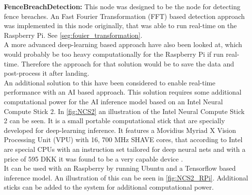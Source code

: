 \documentclass[../Head/Main.tex]{subfiles}
\begin{document}
\textbf{FenceBreachDetection:}
This node was designed to be the node for detecting fence breaches. An Fast Fourier Transformation (FFT) based detection approach was implemented in this node originally, that was able to run real-time on the Raspberry Pi. See \autoref{seg:fouier_transformation}.\\ 
A more advanced deep-learning based approach have also been looked at, which would probably be too heavy computationally for the Raspberry Pi if run real-time. Therefore the approach for that solution would be to save the data and post-process it after landing.\\
An additional solution to this have been considered to enable real-time performance with an AI based approach. This solution requires some additional computational power for the AI inference model based on an Intel Neural Compute Stick 2.
\clearpage
In \autoref{fig:NCS2} an illustration of the Intel Neural Compute Stick 2 can be seen. It is a small portable computational stick that are specially developed for deep-learning inference. It features a Movidius Myriad X Vision Processing Unit (VPU) with 16, 700 MHz SHAVE cores, that according to Intel are special CPUs with an instruction set tailored for deep neural nets and with a price of 595 DKK it was found to be a very capable device  \cite{Intel_NCS2_spec,Intel_NCS2_VPU_spec,Intel_NCS2_price}.\\
It can be used with an Raspberry by running Ubuntu and a Tensorflow based inference model. An illustration of this can be seen in \autoref{fig:NCS2_RPi}. Additional sticks can be added to the system for additional computational power.
\end{document}
